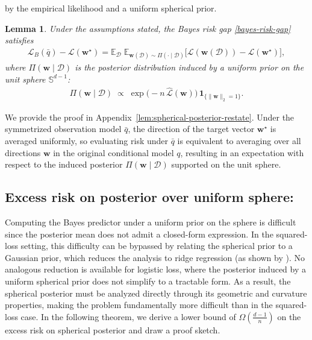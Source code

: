 \documentclass{article}
\theoremstyle{plain}
\newtheorem{lemma}[theorem]{Lemma}
\theoremstyle{definition}
\theoremstyle{remark}
\begin{document}
by the empirical likelihood and a uniform spherical prior. 
\begin{lemma}
\label{lem:spherical-posterior}
Under the assumptions stated, the Bayes risk gap \eqref{bayes-risk-gap} satisfies
\begin{align*}
\mathcal{L}_B(\bar q) - \mathcal{L}(\boldsymbol w^\star)
=
\mathbb E_{\mathcal{D}}
\;
\mathbb E_{\boldsymbol w(\mathcal{D})\sim \Pi(\cdot\mid \mathcal{D})}
\Big[
\mathcal L(\boldsymbol w(\mathcal{D})) - \mathcal L(\boldsymbol w^\star)
\Big],
\end{align*}
where $\Pi(\boldsymbol w\mid \mathcal{D})$ is the posterior distribution induced by a uniform
prior on the unit sphere $\mathbb S^{d-1}$:
\begin{align*}
\Pi(\boldsymbol w\mid \mathcal{D})\;\propto\;\exp\!\big(-n\,\widehat{\mathcal L}(\boldsymbol w)\big)\,\mathbf 1_{\{\|\boldsymbol w\|_2=1\}}. 
\end{align*}
\end{lemma}

We provide the proof in Appendix~\ref{lem:spherical-posterior-restate}. Under the
symmetrized observation model $\bar q$, the direction of the target vector
$\boldsymbol w^{\star}$ is averaged uniformly, so evaluating risk under $\bar q$
is equivalent to averaging over all directions $\boldsymbol w$ in the original
conditional model $q$, resulting in an expectation with respect to the induced
posterior $\Pi(\boldsymbol w\mid \mathcal D)$ supported on the unit sphere.

\subsection{Excess risk on posterior over uniform sphere:}

Computing the Bayes predictor under a uniform prior on the sphere is difficult since the posterior mean does not admit a closed-form expression.
In the squared-loss setting, this difficulty can be bypassed by relating the spherical
prior to a Gaussian prior, which reduces the analysis to ridge regression (as shown by \citet{pmlr-v272-warmuth25a}). No analogous reduction is available for logistic loss, where the posterior induced
by a uniform spherical prior does not simplify to a tractable form. As a result, the spherical posterior must be analyzed directly through its geometric
and curvature properties, making the problem fundamentally more difficult than in
the squared-loss case. In the following theorem, we derive a lower bound of $\Omega(\frac{d-1}{n})$ on the excess risk on spherical posterior and draw a proof sketch.
\end{document}
